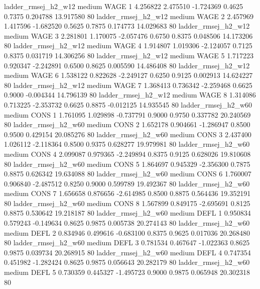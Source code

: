    ladder_rmsej_h2_w12     medium     WAGE                 1  4.256822 2.475510 -1.724369 0.4625 0.7375  0.204788   13.917580 80
   ladder_rmsej_h2_w12     medium     WAGE                 2  2.457969 1.417596 -1.682520 0.5625 0.7875  0.174773   14.029683 80
   ladder_rmsej_h2_w12     medium     WAGE                 3  2.281801 1.170075 -2.057476 0.6750 0.8375  0.048506   14.173206 80
   ladder_rmsej_h2_w12     medium     WAGE                 4  1.914807 1.019306 -2.124057 0.7125 0.8375  0.031719   14.306256 80
   ladder_rmsej_h2_w12     medium     WAGE                 5  1.717223 0.920347 -2.242891 0.6500 0.8625  0.005590   14.486408 80
   ladder_rmsej_h2_w12     medium     WAGE                 6  1.538122 0.822628 -2.249127 0.6250 0.9125  0.002913   14.624227 80
   ladder_rmsej_h2_w12     medium     WAGE                 7  1.368413 0.736342 -2.259468 0.6625 0.9000 -0.004344   14.796139 80
   ladder_rmsej_h2_w12     medium     WAGE                 8  1.314086 0.713225 -2.353732 0.6625 0.8875 -0.012125   14.935545 80
   ladder_rmsej_h2_w60     medium     CONS                 1  1.761095 1.029898 -0.737791 0.9000 0.9750  0.337782   20.240569 80
   ladder_rmsej_h2_w60     medium     CONS                 2  1.652178 0.904661 -1.286947 0.8500 0.9500  0.429154   20.085276 80
   ladder_rmsej_h2_w60     medium     CONS                 3  2.437400 1.026112 -2.118364 0.8500 0.9375  0.628277   19.979981 80
   ladder_rmsej_h2_w60     medium     CONS                 4  2.099087 0.979365 -2.249894 0.8375 0.9125  0.628026   19.810608 80
   ladder_rmsej_h2_w60     medium     CONS                 5  1.864697 0.945329 -2.356300 0.7875 0.8875  0.626342   19.634088 80
   ladder_rmsej_h2_w60     medium     CONS                 6  1.760007 0.906840 -2.487512 0.8250 0.9000  0.599789   19.492367 80
   ladder_rmsej_h2_w60     medium     CONS                 7  1.656658 0.876656 -2.614985 0.8500 0.8875  0.564436   19.352191 80
   ladder_rmsej_h2_w60     medium     CONS                 8  1.567899 0.849175 -2.695691 0.8125 0.8875  0.530642   19.218187 80
   ladder_rmsej_h2_w60     medium     DEFL                 1  0.950834 0.579243 -0.149634 0.8625 0.9875  0.005738   20.274143 80
   ladder_rmsej_h2_w60     medium     DEFL                 2  0.834946 0.499616 -0.683100 0.8375 0.9625  0.017036   20.268480 80
   ladder_rmsej_h2_w60     medium     DEFL                 3  0.781534 0.467647 -1.022363 0.8625 0.9875  0.039734   20.268915 80
   ladder_rmsej_h2_w60     medium     DEFL                 4  0.747354 0.451982 -1.282424 0.8625 0.9875  0.056643   20.282179 80
   ladder_rmsej_h2_w60     medium     DEFL                 5  0.730359 0.445327 -1.495723 0.9000 0.9875  0.065948   20.302318 80
